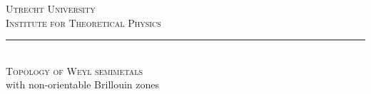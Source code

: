\documentclass[12pt,a4paper]{report}
\theoremstyle{definition}
\theoremstyle{remark}
\newcommand{\?}{\stackrel{?}{=}}
\begin{document}
	
\begin{titlepage}  %
	
	\centering
	
	\textsc{\LARGE Utrecht University}\\[.3cm]
	\textsc{\Large Institute for Theoretical Physics}\\[.8cm]
	
	
	\rule{\linewidth}{0.5mm}\\[0.4cm]
	
	{\Huge\textsc{Topology of Weyl semimetals}\\[.2cm] \huge  with non-orientable Brillouin zones}\\[0.4cm] %
	

\end{titlepage}
\end{document}
